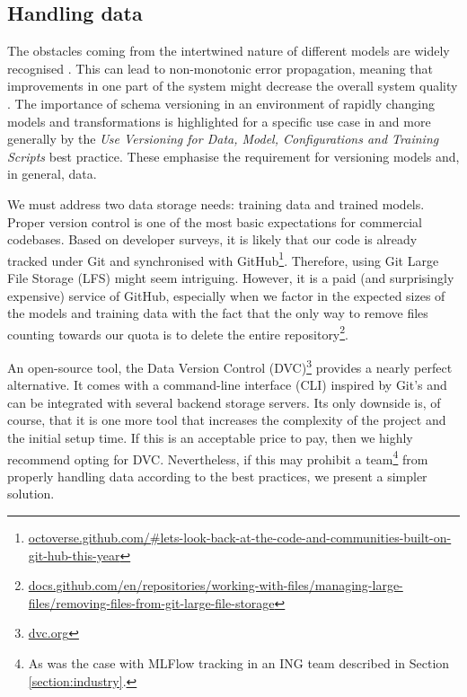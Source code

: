 \subsection{Handling data} \label{subsection:large-file}

The obstacles coming from the intertwined nature of different models are widely recognised \cite{haakman2021ai,amershi2019software,sculley2015hidden}. This can lead to non-monotonic error propagation, meaning that improvements in one part of the system might decrease the overall system quality \cite{amershi2019software}. The importance of schema versioning in an environment of rapidly changing models and transformations is highlighted for a specific use case in \cite{van2017versioning} and more generally by the \textit{Use Versioning for Data, Model, Configurations and Training Scripts} best practice. These emphasise the requirement for versioning models and, in general, data.

We must address two data storage needs: training data and trained models. Proper version control is one of the most basic expectations for commercial codebases. Based on developer surveys, it is likely that our code is already tracked under Git and synchronised with GitHub\footnote{\href{https://octoverse.github.com/\#lets-look-back-at-the-code-and-communities-built-on-git-hub-this-year}{octoverse.github.com/\#lets-look-back-at-the-code-and-communities-built-on-git-hub-this-year}}. Therefore, using Git Large File Storage (LFS) might seem intriguing. However, it is a paid (and surprisingly expensive) service of GitHub, especially when we factor in the expected sizes of the models and training data with the fact that the only way to remove files counting towards our quota is to delete the entire repository\footnote{\href{https://docs.github.com/en/repositories/working-with-files/managing-large-files/removing-files-from-git-large-file-storage\#git-lfs-objects-in-your-repository}{docs.github.com/en/repositories/working-with-files/managing-large-files/removing-files-from-git-large-file-storage}}.

An open-source tool, the Data Version Control (DVC)\footnote{\href{https://dvc.org/}{dvc.org}} provides a nearly perfect alternative. It comes with a command-line interface (CLI) inspired by Git's and can be integrated with several backend storage servers. Its only downside is, of course, that it is one more tool that increases the complexity of the project and the initial setup time. If this is an acceptable price to pay, then we highly recommend opting for DVC. Nevertheless, if this may prohibit a team\footnote{As was the case with MLFlow tracking in an ING team described in Section \ref{section:industry}.} from properly handling data according to the best practices, we present a simpler solution.

